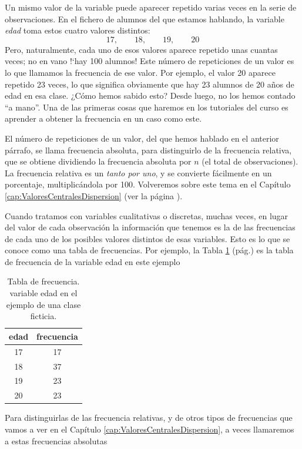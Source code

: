 Un mismo valor de la variable puede aparecer repetido varias veces en
la serie de observaciones. En el fichero de alumnos del que estamos
hablando, la variable {\em edad} toma estos cuatro valores distintos:
\[17,\qquad  18,\qquad 19,\qquad 20\]
Pero, naturalmente, cada uno de esos valores aparece repetido unas cuantas veces; no en vano {!`}hay 100 alumnos! Este {\sf número de repeticiones de un
valor} es lo que llamamos la {\sf frecuencia}  de ese valor. Por ejemplo, el valor 20 aparece repetido 23 veces, lo que significa
obviamente que hay 23 alumnos de 20 años de edad en esa clase. ¿Cómo hemos sabido esto? Desde luego, no los hemos contado ``a mano''. Una de las
primeras cosas que haremos en los tutoriales del curso es aprender a obtener la frecuencia en un caso como este.



El número de repeticiones de un valor, del que hemos hablado en el anterior párrafo, se llama {\sf frecuencia absoluta}, para distinguirlo de la {\sf frecuencia relativa}, que se obtiene dividiendo la frecuencia absoluta por $n$ (el
total de observaciones). La frecuencia relativa es un {\em tanto por uno}, y se convierte fácilmente en un {\sf porcentaje}, multiplicándola por 100. Volveremos sobre este tema en el Capítulo \ref{cap:ValoresCentralesDispersion} (ver la página \pageref{cap02:subsubsec:MedianaTablasFrecuenciasRelativasAcumuladas}).


Cuando tratamos con variables cualitativas o discretas, muchas veces, en lugar del valor de cada observación la información que tenemos es la
de las frecuencias de cada uno de los posibles valores distintos de esas variables. Esto es lo que se conoce como una {\sf tabla de
frecuencias}. Por ejemplo, la Tabla \ref{cap01:tabla:FrecuenciaEdadClase} (pág.\pageref{cap01:tabla:FrecuenciaEdadClase})
es la tabla de frecuencia de la variable edad en este ejemplo

\begin{table}[ht]
\centering
\begin{tabular}{cc}
  \hline
  edad& frecuencia \\
  \hline
  17 &  17 \\
  18 &  37 \\
  19 &  23 \\
  20 &  23 \\
   \hline
\end{tabular}
\caption{Tabla de frecuencia. variable edad en el ejemplo de una clase ficticia.}
\label{cap01:tabla:FrecuenciaEdadClase}
\end{table}
Para distinguirlas de las frecuencia relativas, y de otros tipos de frecuencias que vamos a ver en el Capítulo \ref{cap:ValoresCentralesDispersion}, a veces llamaremos a estas {\sf frecuencias absolutas}

